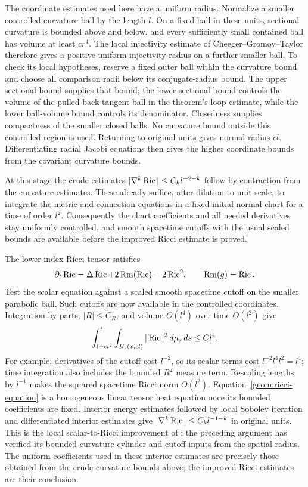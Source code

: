 The coordinate estimates used here have a uniform radius. Normalize
a smaller controlled curvature ball by the length $l$. On a fixed
ball in these units, sectional curvature is bounded above and below,
and every sufficiently small contained ball has volume at least
$c r^4$. The local injectivity estimate of Cheeger--Gromov--Taylor
\cite[Theorem~4.3]{CheegerGromovTaylor1982} therefore gives a positive
uniform injectivity radius on a further smaller ball. To check its
local hypotheses, reserve a fixed outer ball within the curvature
bound and choose all comparison radii below its conjugate-radius
bound. The upper sectional bound supplies that bound; the lower
sectional bound controls the volume of the pulled-back tangent ball
in the theorem's loop estimate, while the lower ball-volume bound
controls its denominator. Closedness supplies compactness of the
smaller closed balls. No curvature bound outside this controlled
region is used. Returning to original units gives normal radius
$c l$. Differentiating radial Jacobi equations then gives the higher
coordinate bounds from the covariant curvature bounds.

At this stage the crude estimates
$|\nabla^k\operatorname{Ric}|\leq C_k l^{-2-k}$ follow by contraction from the
curvature estimates. These already suffice, after dilation to unit
scale, to integrate the metric and connection equations in a fixed
initial normal chart for a time of order $l^2$. Consequently the
chart coefficients and all needed derivatives stay uniformly
controlled, and smooth spacetime cutoffs with the usual scaled
bounds are available before the improved Ricci estimate is proved.

The lower-index Ricci tensor satisfies
\begin{equation}\label{geom:ricci-equation}
 \partial_t\operatorname{Ric}=\Delta\operatorname{Ric}+2\operatorname{Rm}(\operatorname{Ric})-2\operatorname{Ric}^2,
       \qquad \operatorname{Rm}(g)=\operatorname{Ric}.
\end{equation}
Test the scalar equation against a scaled smooth spacetime cutoff on
the smaller parabolic ball. Such cutoffs are now available in the
controlled coordinates. Integration by parts, $|R|\leq C_R$, and
volume $O(l^4)$ over time $O(l^2)$ give
\begin{equation}\label{geom:scalar-energy}
 \int_{t-cl^2}^{t}\int_{B_s(x,cl)}|\operatorname{Ric}|^2\,d\mu_s\,ds
       \leq Cl^4.
\end{equation}
For example, derivatives of the cutoff cost $l^{-2}$, so its scalar
terms cost $l^{-2}l^4l^2= l^4$; time integration also includes the
bounded $R^2$ measure term. Rescaling lengths by $l^{-1}$ makes the
squared spacetime Ricci norm $O(l^2)$. Equation~\eqref{geom:ricci-equation}
is a homogeneous linear tensor heat equation once its bounded
coefficients are fixed. Interior energy estimates followed by local
Sobolev iteration and differentiated interior estimates give
$|\nabla^k\operatorname{Ric}|\leq C_k l^{-1-k}$ in original units.
This is the local scalar-to-Ricci improvement of
\cite[arXiv version, Lemma~6.1]{BamlerZhangI}; the preceding argument
has verified its bounded-curvature cylinder and cutoff inputs from
the spatial radius. The uniform coefficients used in these interior
estimates are precisely those obtained from the crude curvature bounds above;
the improved Ricci estimates are their conclusion.

